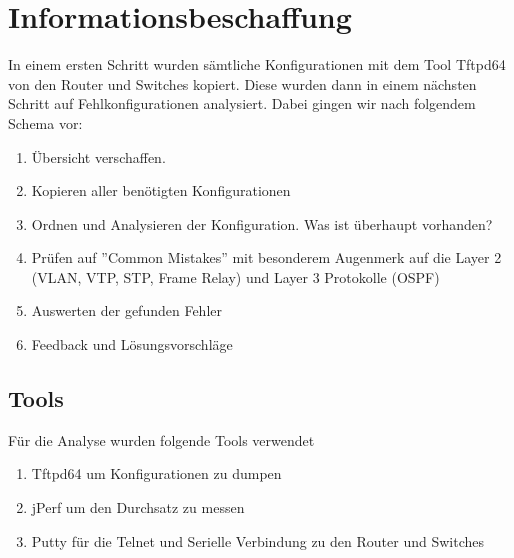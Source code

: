 

\newcommand{\SUBJECT}{Report}
\newcommand{\TITLE}{Cloud Infrastructre Lab 1}







\section{Informationsbeschaffung}
In einem ersten Schritt wurden sämtliche Konfigurationen mit dem Tool Tftpd64 von den Router und Switches kopiert. Diese wurden dann in einem nächsten Schritt auf Fehlkonfigurationen analysiert. Dabei gingen wir nach folgendem Schema vor:

\begin{enumerate}
	\item Übersicht verschaffen. 
	\item Kopieren aller benötigten Konfigurationen
	\item Ordnen und Analysieren der Konfiguration. Was ist überhaupt vorhanden?
	\item Prüfen auf ''Common Mistakes'' mit besonderem Augenmerk auf die Layer 2 (VLAN, VTP, STP, Frame Relay) und Layer 3 Protokolle (OSPF)
	\item Auswerten der gefunden Fehler
	\item Feedback und Lösungsvorschläge
\end{enumerate}

\subsection{Tools}
Für die Analyse wurden folgende Tools verwendet
\begin{enumerate}
	\item Tftpd64 um Konfigurationen zu dumpen
	\item jPerf um den Durchsatz zu messen
	\item Putty für die Telnet und Serielle Verbindung zu den Router und Switches
\end{enumerate}

